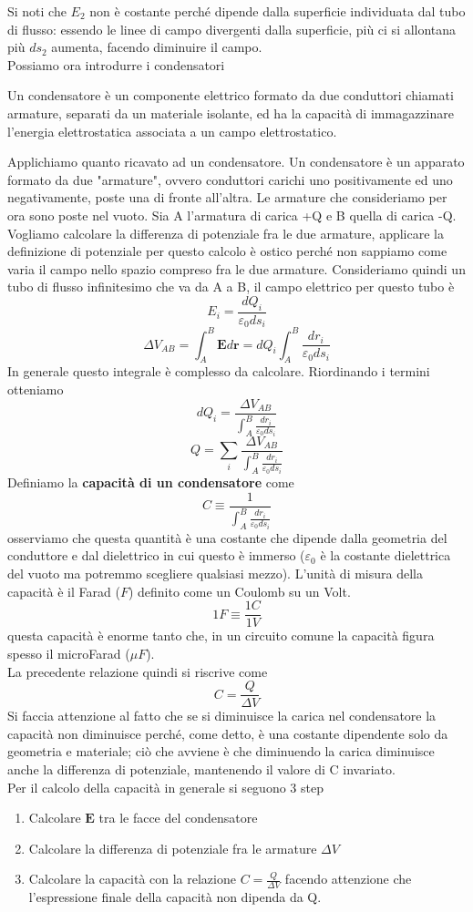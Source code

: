 \documentclass[
10pt, %
a4paper, %
oneside, %
headinclude,footinclude, %
BCOR5mm, %
]{scrartcl}
\begin{document}
Si noti che \(E_2\) non è costante perché dipende dalla superficie individuata dal tubo di flusso: essendo le linee di campo divergenti dalla superficie, più ci si allontana più \(ds_2\) aumenta, facendo diminuire il campo.\\
Possiamo ora introdurre i condensatori
\begin{definizione}[Condensatore]
	Un condensatore è un componente elettrico formato da due conduttori chiamati armature, separati da un materiale isolante, ed ha la capacità di immagazzinare l'energia elettrostatica associata a un campo elettrostatico.
\end{definizione}
Applichiamo quanto ricavato ad un condensatore. Un condensatore è un apparato formato da due "armature", ovvero conduttori carichi uno positivamente ed uno negativamente, poste una di fronte all'altra. Le armature che consideriamo per ora sono poste nel vuoto. Sia A l'armatura di carica +Q e B quella di carica -Q. Vogliamo calcolare la differenza di potenziale fra le due armature, applicare la definizione di potenziale per questo calcolo è ostico perché non sappiamo come varia il campo nello spazio compreso fra le due armature. Consideriamo quindi un tubo di flusso infinitesimo che va da A a B, il campo elettrico per questo tubo è
\[E_i  = \frac{dQ_i}{\varepsilon_0 ds_i}\]
\[\Delta V_{AB} = \int_{A}^{B}\mathbf{E}d\mathbf{r} =dQ_i \int_{A}^{B}\frac{dr_i}{\varepsilon_0 ds_i}\]
In generale questo integrale è complesso da calcolare. Riordinando i termini otteniamo
\[dQ_i = \frac{\Delta V_{AB}}{\int_{A}^{B}\frac{dr_i}{\varepsilon_0 ds_i}}\]
\[Q = \sum_i\frac{\Delta V_{AB}}{\int_{A}^{B}\frac{dr_i}{\varepsilon_0 ds_i}}\]
Definiamo la \textbf{capacità di un condensatore} come
\[C\equiv \frac{1}{{ \int_{A}^{B}\frac{dr_i}{\varepsilon_0 ds_i}}}\]
osserviamo che questa quantità è una costante che dipende dalla geometria del conduttore e dal dielettrico in cui questo è immerso ($\varepsilon_0$ è la costante dielettrica del vuoto ma potremmo scegliere qualsiasi mezzo). L'unità di misura della capacità è il Farad (\(F\)) definito come un Coulomb su un Volt. 
\[1F \equiv \frac{1C}{1V}\]
questa capacità è enorme tanto che, in un circuito comune la capacità figura spesso il microFarad (\(\mu F\)).\\
La precedente relazione quindi si riscrive come
\[C = \frac{Q}{\Delta V}\]
Si faccia attenzione al fatto che se si diminuisce la carica nel condensatore la capacità non diminuisce perché, come detto, è una costante dipendente solo da geometria e materiale; ciò che avviene è che diminuendo la carica diminuisce anche la differenza di potenziale, mantenendo il valore di C invariato.\\
Per il calcolo della capacità in generale si seguono 3 step
\begin{enumerate}
\item Calcolare $\mathbf{E}$ tra le facce del condensatore
\item Calcolare la differenza di potenziale fra le armature \(\Delta V\)
\item Calcolare la capacità con la relazione \(C=\frac{Q}{\Delta V}\) facendo attenzione che l'espressione finale della capacità non dipenda da Q. 
\end{enumerate} 
\end{document}
